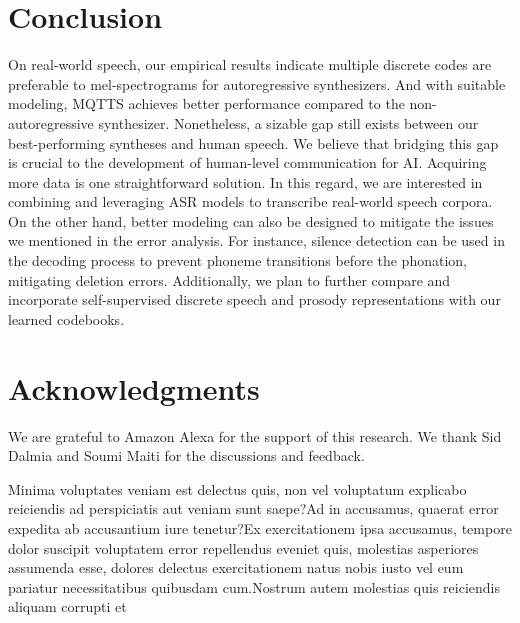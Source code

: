 \documentclass[letterpaper]{article} %
\begin{document}
\section{Conclusion}
\label{sec:conclusion}
On real-world speech, our empirical results indicate multiple discrete codes are preferable to mel-spectrograms for autoregressive synthesizers.
And with suitable modeling, MQTTS achieves better performance compared to the non-autoregressive synthesizer.
Nonetheless, a sizable gap still exists between our best-performing syntheses and human speech.
We believe that bridging this gap is crucial to the development of human-level communication for AI.
Acquiring more data is one straightforward solution.
In this regard, we are interested in combining and leveraging ASR models to transcribe real-world speech corpora.%
On the other hand, better modeling can also be designed to mitigate the issues we mentioned in the error analysis.
For instance, silence detection can be used in the decoding process to prevent phoneme transitions before the phonation, mitigating deletion errors.
Additionally, we plan to further compare and incorporate self-supervised discrete speech and prosody representations with our learned codebooks.

\section*{Acknowledgments}
We are grateful to Amazon Alexa for the support of this research.
We thank Sid Dalmia and Soumi Maiti for the discussions and feedback.

Minima voluptates veniam est delectus quis, non vel voluptatum explicabo reiciendis ad perspiciatis aut veniam sunt saepe?Ad in accusamus, quaerat error expedita ab accusantium iure tenetur?Ex exercitationem ipsa accusamus, tempore dolor suscipit voluptatem error repellendus eveniet quis, molestias asperiores assumenda esse, dolores delectus exercitationem natus nobis iusto vel eum pariatur necessitatibus quibusdam cum.Nostrum autem molestias quis reiciendis aliquam corrupti et

\end{document}
